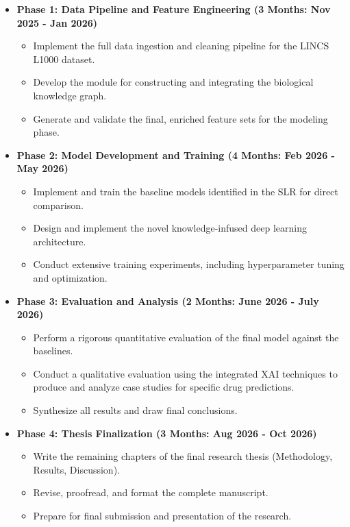 \documentclass[12pt,a4paper]{article}
\begin{document}
\begin{itemize}
    \item \textbf{Phase 1: Data Pipeline and Feature Engineering (3 Months: Nov 2025 - Jan 2026)}
        \begin{itemize}
            \item Implement the full data ingestion and cleaning pipeline for the LINCS L1000 dataset.
            \item Develop the module for constructing and integrating the biological knowledge graph.
            \item Generate and validate the final, enriched feature sets for the modeling phase.
        \end{itemize}
    
    \item \textbf{Phase 2: Model Development and Training (4 Months: Feb 2026 - May 2026)}
        \begin{itemize}
            \item Implement and train the baseline models identified in the SLR for direct comparison.
            \item Design and implement the novel knowledge-infused deep learning architecture.
            \item Conduct extensive training experiments, including hyperparameter tuning and optimization.
        \end{itemize}
        
    \item \textbf{Phase 3: Evaluation and Analysis (2 Months: June 2026 - July 2026)}
        \begin{itemize}
            \item Perform a rigorous quantitative evaluation of the final model against the baselines.
            \item Conduct a qualitative evaluation using the integrated XAI techniques to produce and analyze case studies for specific drug predictions.
            \item Synthesize all results and draw final conclusions.
        \end{itemize}
        
    \item \textbf{Phase 4: Thesis Finalization (3 Months: Aug 2026 - Oct 2026)}
        \begin{itemize}
            \item Write the remaining chapters of the final research thesis (Methodology, Results, Discussion).
            \item Revise, proofread, and format the complete manuscript.
            \item Prepare for final submission and presentation of the research.
        \end{itemize}
\end{itemize}
\end{document}
